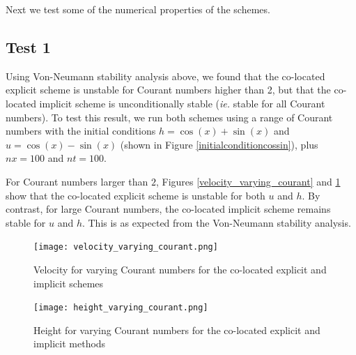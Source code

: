 \documentclass[a4paper, 10.5pt, notitlepage]{article}
\begin{document}
Next we test some of the numerical properties of the schemes.
\subsection{Test 1}
Using Von-Neumann stability analysis above, we found that the co-located explicit scheme is unstable for Courant numbers higher than 2, but that the co-located implicit scheme is unconditionally stable (\textit{ie.} stable for all Courant numbers). To test this result, we run both schemes using a range of Courant numbers with the initial conditions $h = \cos(x) + \sin(x)$ and $u = \cos(x) -\sin(x)$ (shown in Figure \ref{initialconditioncossin}), plus $nx = 100$ and $nt = 100$.

For Courant numbers larger than $2$, Figures \ref{velocity_varying_courant} and \ref{height_varying_courant} show that the co-located explicit scheme is unstable for both $u$ and $h$. By contrast, for large Courant numbers, the co-located implicit scheme remains stable for $u$ and $h$. This is as expected from the Von-Neumann stability analysis.

\begin{figure}[H]
	\begin{minipage}{.5\textwidth}
		\ContinuedFloat*
		\captionsetup{width=0.9\textwidth}
		\captionsetup{justification=centering}
		\texttt{[image: velocity\_varying\_courant.png]}
		\caption{\label{velocity_varying_courant} Velocity for varying Courant numbers for the co-located explicit and implicit schemes} 
	\end{minipage}
	\begin{minipage}{.5\textwidth}
	\ContinuedFloat
	\captionsetup{width=0.9\textwidth}
	\captionsetup{justification=centering}
	\texttt{[image: height\_varying\_courant.png]}
	\caption{\label{height_varying_courant} Height for varying Courant numbers for the co-located explicit and implicit methods} 
\end{minipage}
\end{figure}
\end{document}
